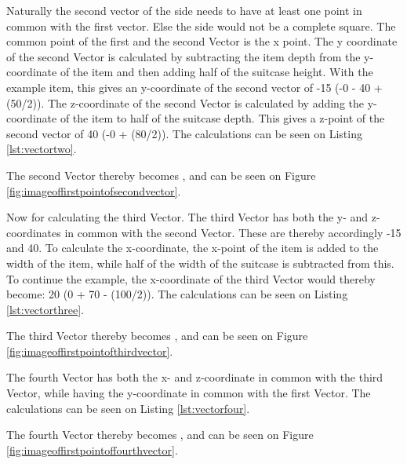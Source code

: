 Naturally the second vector of the side needs to have at least one point in common with the first vector. Else the side would not be a complete square. 
The common point of the first and the second Vector is the x point. 
The y coordinate of the second Vector is calculated by subtracting the item depth from the y-coordinate of the item and then adding half of the suitcase height. With the example item, this gives an y-coordinate of the second vector of -15 (-0 - 40 + (50/2)).
The z-coordinate of the second Vector is calculated by adding the y-coordinate of the item to half of the suitcase depth. This gives a z-point of the second vector of 40 (-0 + (80/2)). The calculations can be seen on Listing \ref{lst:vectortwo}.


The second Vector thereby becomes , and can be seen on Figure \ref{fig:imageoffirstpointofsecondvector}.

Now for calculating the third Vector. The third Vector has both the y- and z- coordinates in common with the second Vector. These are thereby accordingly -15 and 40. 
To calculate the x-coordinate, the x-point of the item is added to the width of the item, while half of the width of the suitcase is subtracted from this. To continue the example, the x-coordinate of the third Vector would thereby become: 20 (0 + 70 - (100/2)). The calculations can be seen on Listing \ref{lst:vectorthree}.


The third Vector thereby becomes , and can be seen on Figure \ref{fig:imageoffirstpointofthirdvector}.


The fourth Vector has both the x- and z-coordinate in common with the third Vector, while having the y-coordinate in common with the first Vector. The calculations can be seen on Listing \ref{lst:vectorfour}.


The fourth Vector thereby becomes , and can be seen on Figure \ref{fig:imageoffirstpointoffourthvector}.


